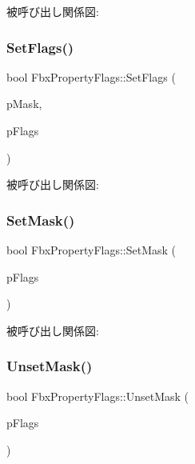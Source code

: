 被呼び出し関係図\+:
\mbox{\label{class_fbx_property_flags_ab5187f4e4f41cb15b59fed3f114036d8}} 
\subsubsection{\texorpdfstring{Set\+Flags()}{SetFlags()}}
{\footnotesize\ttfamily bool Fbx\+Property\+Flags\+::\+Set\+Flags (\begin{DoxyParamCaption}\item[{\hyperlink{class_fbx_property_flags_afabfa7e0949aac8a7dcdf8a141867e99}{Fbx\+Property\+Flags\+::\+E\+Flags}}]{p\+Mask,  }\item[{\hyperlink{class_fbx_property_flags_afabfa7e0949aac8a7dcdf8a141867e99}{Fbx\+Property\+Flags\+::\+E\+Flags}}]{p\+Flags }\end{DoxyParamCaption})}

被呼び出し関係図\+:
\mbox{\label{class_fbx_property_flags_a527b20839865439acfb1ea9e24a67a2e}} 
\subsubsection{\texorpdfstring{Set\+Mask()}{SetMask()}}
{\footnotesize\ttfamily bool Fbx\+Property\+Flags\+::\+Set\+Mask (\begin{DoxyParamCaption}\item[{\hyperlink{class_fbx_property_flags_afabfa7e0949aac8a7dcdf8a141867e99}{Fbx\+Property\+Flags\+::\+E\+Flags}}]{p\+Flags }\end{DoxyParamCaption})}

被呼び出し関係図\+:
\mbox{\label{class_fbx_property_flags_a06121ae3c3792fc4db8f7f749ca15ff1}} 
\subsubsection{\texorpdfstring{Unset\+Mask()}{UnsetMask()}}
{\footnotesize\ttfamily bool Fbx\+Property\+Flags\+::\+Unset\+Mask (\begin{DoxyParamCaption}\item[{\hyperlink{class_fbx_property_flags_afabfa7e0949aac8a7dcdf8a141867e99}{Fbx\+Property\+Flags\+::\+E\+Flags}}]{p\+Flags }\end{DoxyParamCaption})}

